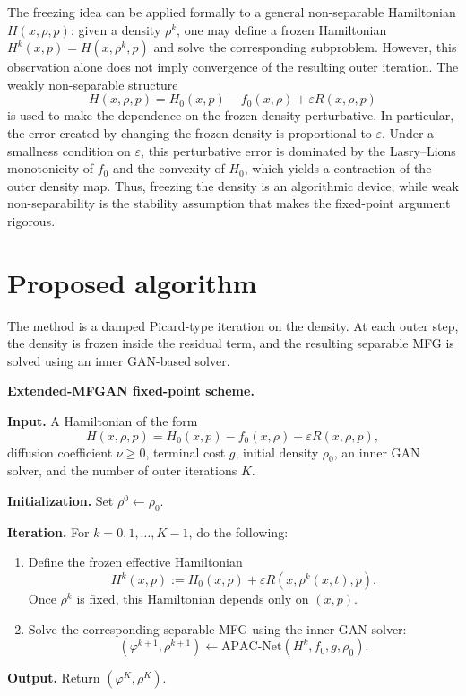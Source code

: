 \documentclass[11pt]{article}
\newcommand{\eps}{\varepsilon}
\begin{document}
The freezing idea can be applied formally to a general non-separable Hamiltonian $H(x,\rho,p)$: given a density $\rho^k$, one may define a frozen Hamiltonian $H^k(x,p)=H(x,\rho^k,p)$ and solve the corresponding subproblem. However, this observation alone does not imply convergence of the resulting outer iteration. The weakly non-separable structure
\[
  H(x,\rho,p)=H_0(x,p)-f_0(x,\rho)+\eps R(x,\rho,p)
\]
is used to make the dependence on the frozen density perturbative. In particular, the error created by changing the frozen density is proportional to $\eps$. Under a smallness condition on $\eps$, this perturbative error is dominated by the Lasry--Lions monotonicity of $f_0$ and the convexity of $H_0$, which yields a contraction of the outer density map. Thus, freezing the density is an algorithmic device, while weak non-separability is the stability assumption that makes the fixed-point argument rigorous.

\section{Proposed algorithm}

The method is a damped Picard-type iteration on the density. At each outer step, the density is frozen inside the residual term, and the resulting separable MFG is solved using an inner GAN-based solver.

\begin{tcolorbox}[colback=blue!4, colframe=blue!50!black, arc=2pt]
\textbf{Extended-MFGAN fixed-point scheme.}

\medskip
\textbf{Input.} A Hamiltonian of the form
\[
  H(x,\rho,p)=H_0(x,p)-f_0(x,\rho)+\eps R(x,\rho,p),
\]
diffusion coefficient \(\nu\geq 0\), terminal cost \(g\), initial density \(\rho_0\), an inner GAN solver, and the number of outer iterations \(K\).

\medskip
\textbf{Initialization.} Set \(\rho^0\leftarrow \rho_0\).

\medskip
\textbf{Iteration.} For \(k=0,1,\dots,K-1\), do the following:
\begin{enumerate}[noitemsep]
  \item Define the frozen effective Hamiltonian
  \[
    H^k(x,p):=H_0(x,p)+\eps R(x,\rho^k(x,t),p).
  \]
  Once \(\rho^k\) is fixed, this Hamiltonian depends only on \((x,p)\).

  \item Solve the corresponding separable MFG using the inner GAN solver:
  \[
    (\varphi^{k+1},\rho^{k+1})
    \leftarrow \mathrm{APAC\text{-}Net}(H^k,f_0,g,\rho_0).
  \]
\end{enumerate}

\medskip
\textbf{Output.} Return \((\varphi^K,\rho^K)\).
\end{tcolorbox}
\end{document}
